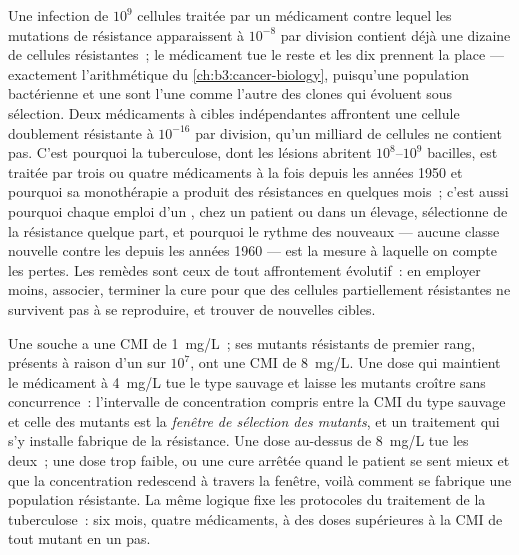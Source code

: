 \begin{proposition}\label{prop:b3:bacteriology:selection}
Une infection de $10^{9}$ cellules traitée par un médicament contre
lequel les mutations de résistance apparaissent à $10^{-8}$ par
division contient déjà une dizaine de cellules résistantes~; le
médicament tue le reste et les dix prennent la place --- exactement
l'arithmétique du \cref{ch:b3:cancer-biology}, puisqu'une population
bactérienne et une  sont l'une comme l'autre des clones qui
évoluent sous sélection. Deux médicaments à cibles indépendantes
affrontent une cellule doublement résistante à $10^{-16}$ par division,
qu'un milliard de cellules ne contient pas. C'est pourquoi la
tuberculose, dont les lésions abritent $10^{8}$--$10^{9}$ bacilles, est
traitée par trois ou quatre médicaments à la fois depuis les années
1950 et pourquoi sa monothérapie a produit des résistances en quelques
mois~; c'est aussi pourquoi chaque emploi d'un , chez un
patient ou dans un élevage, sélectionne de la résistance quelque part,
et pourquoi le rythme des  nouveaux --- aucune classe
nouvelle contre les  depuis les années 1960 --- est la
mesure à laquelle on compte les pertes. Les remèdes sont ceux de tout
affrontement évolutif~: en employer moins, associer, terminer la cure
pour que des cellules partiellement résistantes ne survivent pas à se
reproduire, et trouver de nouvelles cibles.
\end{proposition}

\begin{example}\label{ex:b3:bacteriology:window}
Une souche a une CMI de \qty{1}{mg/L}~; ses mutants résistants de
premier rang, présents à raison d'un sur $10^{7}$, ont une CMI de
\qty{8}{mg/L}. Une dose qui maintient le médicament à \qty{4}{mg/L} tue
le type sauvage et laisse les mutants croître sans concurrence~:
l'intervalle de concentration compris entre la CMI du type sauvage et
celle des mutants est la \emph{fenêtre de sélection des mutants}, et un
traitement qui s'y installe fabrique de la résistance. Une dose
au-dessus de \qty{8}{mg/L} tue les deux~; une dose trop faible, ou une
cure arrêtée quand le patient se sent mieux et que la concentration
redescend à travers la fenêtre, voilà comment se fabrique une
population résistante. La même logique fixe les protocoles du
traitement de la tuberculose~: six mois, quatre médicaments, à des
doses supérieures à la CMI de tout mutant en un pas.
\end{example}

